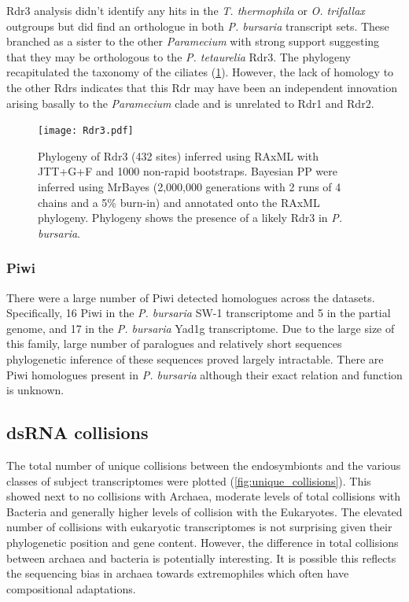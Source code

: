 Rdr3 analysis didn't identify any hits in the \textit{T. thermophila}
or \textit{O. trifallax} outgroups but did find an orthologue
in both \textit{P. bursaria} transcript sets.  These branched
as a sister to the other \textit{Paramecium} with strong support
suggesting that they may be orthologous to the \textit{P. tetaurelia}
Rdr3. The phylogeny recapitulated the taxonomy of the ciliates (\cref{fig:rdr3_phylo}).
However, the lack of homology to the other Rdrs indicates that
this Rdr may have been an independent innovation arising basally to the \textit{Paramecium}
clade and is unrelated to Rdr1 and Rdr2.

\begin{figure}
    \texttt{[image: Rdr3.pdf]}
    \caption[Rdr3 phylogeny]{Phylogeny of Rdr3 (432 sites)
        inferred using RAxML with JTT+G+F and 1000 non-rapid
        bootstraps. Bayesian PP were inferred using MrBayes
        (2,000,000 generations with 2 runs of 4 chains and a 5\% burn-in)
        and annotated onto the RAxML phylogeny.  Phylogeny
        shows the presence of a likely Rdr3 in \textit{P. bursaria}.}
    \label{fig:rdr3_phylo}
\end{figure}

\subsubsection{Piwi}

There were a large number of Piwi detected homologues across
the datasets. Specifically, 16 Piwi in the \textit{P. bursaria} SW-1
transcriptome and 5 in the partial genome, and 17 in the \textit{P. 
bursaria} Yad1g transcriptome.
Due to the large size of this family, large number of paralogues
and relatively short sequences phylogenetic inference
of these sequences proved largely intractable. There are Piwi
homologues present in \textit{P. bursaria} although their exact
relation and function is unknown.


\subsection{dsRNA collisions}

The total number of unique collisions between the endosymbionts and 
the various classes of subject transcriptomes were plotted
(\cref{fig:unique_collisions}). 
This showed next to no collisions with Archaea, moderate levels of total
collisions with Bacteria and generally higher levels of collision
with the Eukaryotes.  The elevated number of collisions with eukaryotic
transcriptomes is not surprising given their 
phylogenetic position and gene content.  However, the difference in total 
collisions between archaea and bacteria is potentially interesting. 
It is possible this reflects the sequencing bias in archaea
towards extremophiles which often have compositional adaptations.


